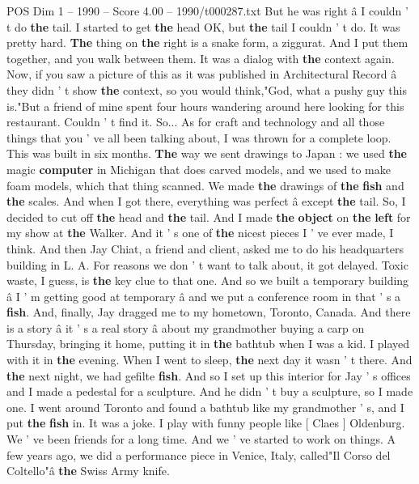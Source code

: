 \begin{textsample}{POS Dim 1 – 1990 – Score 4.00 – 1990/t000287.txt}
But he was right â I couldn ' t do \textbf{the} tail.
I started to get \textbf{the} head OK, but \textbf{the} tail I couldn ' t do.
It was pretty hard. \textbf{The} thing on \textbf{the} right is a snake form, a ziggurat.
And I put them together, and you walk between them.
It was a dialog with \textbf{the} context again.
Now, if you saw a picture of this as it was published in Architectural Record â they didn ' t show \textbf{the} context, so you would think,"God, what a pushy guy this is."But a friend of mine spent four hours wandering around here looking for this restaurant.
Couldn ' t find it.
So...
As for craft and technology and all those things that you ' ve all been talking about, I was thrown for a complete loop.
This was built in six months. \textbf{The} way we sent drawings to Japan : we used \textbf{the} magic \textbf{computer} in Michigan that does carved models, and we used to make foam models, which that thing scanned.
We made \textbf{the} drawings of \textbf{the} \textbf{fish} and \textbf{the} scales.
And when I got there, everything was perfect â except \textbf{the} tail.
So, I decided to cut off \textbf{the} head and \textbf{the} tail.
And I made \textbf{the} \textbf{object} on \textbf{the} \textbf{left} for my show at \textbf{the} Walker.
And it ' s one of \textbf{the} nicest pieces I ' ve ever made, I think.
And then Jay Chiat, a friend and client, asked me to do his headquarters building in L.
A.
For reasons we don ' t want to talk about, it got delayed.
Toxic waste, I guess, is \textbf{the} key clue to that one.
And so we built a temporary building â I ' m getting good at temporary â and we put a conference room in that ' s a \textbf{fish}.
And, finally, Jay dragged me to my hometown, Toronto, Canada.
And there is a story â it ' s a real story â about my grandmother buying a carp on Thursday, bringing it home, putting it in \textbf{the} bathtub when I was a kid.
I played with it in \textbf{the} evening.
When I went to sleep, \textbf{the} next day it wasn ' t there.
And \textbf{the} next night, we had gefilte \textbf{fish}.
And so I set up this interior for Jay ' s offices and I made a pedestal for a sculpture.
And he didn ' t buy a sculpture, so I made one.
I went around Toronto and found a bathtub like my grandmother ' s, and I put \textbf{the} \textbf{fish} in.
It was a joke.
I play with funny people like [ Claes ] Oldenburg.
We ' ve been friends for a long time.
And we ' ve started to work on things.
A few years ago, we did a performance piece in Venice, Italy, called"Il Corso del Coltello"â \textbf{the} Swiss Army knife.

\end{textsample}
